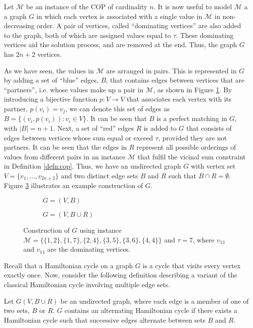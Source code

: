 \documentclass[oribibl]{llncs}
\begin{document}
Let $\mathcal{M}$ be an instance of the COP of cardinality $n$. It is now useful to model $\mathcal{M}$ a a graph $G$ in which each vertex is associated with a single value in $\mathcal{M}$ in non-decreasing order. A pair of vertices, called ``dominating vertices'' are also added to the graph, both of which are assigned values equal to $\tau$. These dominating vertices aid the solution process, and are removed at the end. Thus, the graph $G$ has $2n+2$ vertices.

As we have seen, the values in $\mathcal{M}$ are arranged in pairs. This is represented in $G$ by adding a set of ``blue'' edges, $B$, that contains edges between vertices that are ``partners'', i.e. whose values make up a pair in $\mathcal{M}$, as shown in Figure \ref{fig:partners}. By introducing a bijective function $p: V \to V$ that associates each vertex with its partner, $p(v_i) = v_j$, we can denote this set of edges as $B = \{(v_i, p(v_i)) : v_i \in V\}$. It can be seen that $B$ is a perfect matching in $G$, with $|B| = n+1$. Next, a set of ``red'' edges $R$ is added to $G$ that consists of edges between vertices whose sum equal or exceed $\tau$, provided they are not partners. It can be seen that the edges in $R$ represent all possible orderings of values from different pairs in an instance $\mathcal{M}$ that fulfil the vicinal sum constraint in Definition \ref{defn:cop}. Thus, we have an undirected graph $G$ with vertex set $V = \{v_1, ..., v_{2n+2}\}$ and two distinct edge sets $B$ and $R$ such that $B \cap R = \emptyset$. Figure \ref{fig:partners/threshold} illustrates an example construction of $G$.
\begin{figure}	
\centering
\begin{subfigure}[h]{0.45\textwidth}
	
	\caption{$G = (V, B)$}	
	\label{fig:partners}
\end{subfigure} \hspace{40pt}
\begin{subfigure}[h]{0.45\textwidth}
	
	\caption{$G=(V, B \cup R)$}	
	\label{fig:threshold}
\end{subfigure}
\caption{Construction of $G$ using instance $\mathcal{M} = \{\{1,2\}, \{1,7\}, \{2,4\}, \{3,5\}, \{3,6\}, \{4,4\}\}$ and $\tau = 7$, where $v_{13}$ and $v_{14}$ are the dominating vertices.}
\label{fig:partners/threshold}
\end{figure}

Recall that a Hamiltonian cycle on a graph $G$ is a cycle that visits every vertex exactly once. Now, consider the following definition describing a variant of the classical Hamiltonian cycle involving multiple edge sets.
\begin{definition}
	\label{defn:althamcycle}
	Let $G(V, B\cup R)$ be an undirected graph, where each edge is a member of one of two sets, $B$ or $R$. $G$ contains an alternating Hamiltonian cycle if there exists a Hamiltonian cycle such that successive edges alternate between sets $B$ and $R$.
\end{definition}
\end{document}
